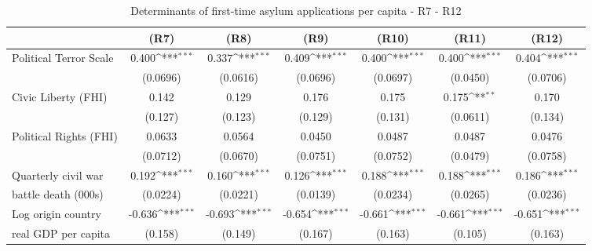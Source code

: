 \begin{table}[htbp]\centering \footnotesize
\def\sym#1{\ifmmode^{#1}\else\(^{#1}\)\fi}
\caption{Determinants of first-time asylum applications per capita - R7 - R12}
\begin{tabular}{l*{6}{c}}
\hline\hline
                    &\multicolumn{1}{c}{(R7)}         &\multicolumn{1}{c}{(R8)}         &\multicolumn{1}{c}{(R9)}         &\multicolumn{1}{c}{(R10)}         &\multicolumn{1}{c}{(R11)}         &\multicolumn{1}{c}{(R12)}         \\
\hline
Political Terror Scale	&       0.400\sym{***}& 0.337\sym{***}    &       0.409\sym{***}&       0.400\sym{***}&       0.400\sym{***}&       0.404\sym{***}\\
                    	&    (0.0696)         &     (0.0616)                  &    (0.0696)         &    (0.0697)         &    (0.0450)         &    (0.0706)         \\
[0,5em]
Civic Liberty (FHI) 	&       0.142         &        0.129              &       0.176         &       0.175         &       0.175\sym{**} &       0.170         \\
                    	&     (0.127)         &        (0.123)             &     (0.129)         &     (0.131)         &    (0.0611)         &     (0.134)         \\
[0,5em]
Political Rights (FHI)	&      0.0633         &       0.0564                &      0.0450         &      0.0487         &      0.0487         &      0.0476         \\
                    	&    (0.0712)         &          (0.0670)           &    (0.0751)         &    (0.0752)         &    (0.0479)         &    (0.0758)         \\
[0,5em]
Quarterly civil war 	&       0.192\sym{***}&     0.160\sym{***}          &    0.126\sym{***}                 &       0.188\sym{***}&       0.188\sym{***}&       0.186\sym{***}\\
battle death (000s)     &    (0.0224)         &  (0.0221)                   &     (0.0139)                 &    (0.0234)         &    (0.0265)         &    (0.0236)         \\
[0,5em]
Log origin country 		&      -0.636\sym{***}&   -0.693\sym{***}                  &      -0.654\sym{***}&      -0.661\sym{***}&      -0.661\sym{***}&      -0.651\sym{***}\\
real GDP per capita     &     (0.158)         &     (0.149)                 &     (0.167)         &     (0.163)         &     (0.105)         &     (0.163)         \\

\end{tabular}
\end{table}

